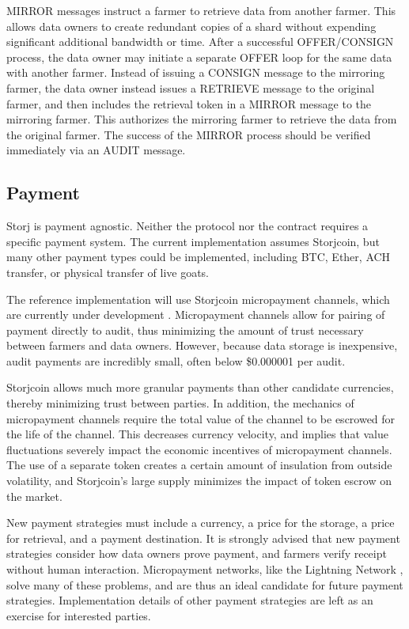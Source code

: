 \documentclass[a4paper,10pt]{article}
\begin{document}
MIRROR messages instruct a farmer to retrieve data from another farmer. This
allows data owners to create redundant copies of a shard without expending
significant additional bandwidth or time. After a successful OFFER/CONSIGN
process, the data owner may initiate a separate OFFER loop for the same data
with another farmer. Instead of issuing a CONSIGN message to the mirroring
farmer, the data owner instead issues a RETRIEVE message to the original farmer,
and then includes the retrieval token in a MIRROR message to the mirroring
farmer. This authorizes the mirroring farmer to retrieve the data from the
original farmer. The success of the MIRROR process should be verified
immediately via an AUDIT message.

\subsection{Payment}
Storj is payment agnostic. Neither the protocol nor the contract requires a
specific payment system. The current implementation assumes Storjcoin, but many
other payment types could be implemented, including BTC, Ether, ACH transfer, or
physical transfer of live goats.

The reference implementation will use Storjcoin micropayment channels, which are
currently under development \cite{26}. Micropayment channels allow for pairing
of payment directly to audit, thus minimizing the amount of trust necessary
between farmers and data owners. However, because data storage is inexpensive,
audit payments are incredibly small, often below \$0.000001 per audit.

Storjcoin allows much more granular payments than other candidate currencies,
thereby minimizing trust between parties. In addition, the mechanics of
micropayment channels require the total value of the channel to be escrowed for
the life of the channel. This decreases currency velocity, and implies that
value fluctuations severely impact the economic incentives of micropayment
channels. The use of a separate token creates a certain amount of insulation
from outside volatility, and Storjcoin's large supply minimizes the impact of
token escrow on the market.

New payment strategies must include a currency, a price for the storage, a price
for retrieval, and a payment destination. It is strongly advised that new
payment strategies consider how data owners prove payment, and farmers verify
receipt without human interaction. Micropayment networks, like the Lightning
Network \cite{25}, solve many of these problems, and are thus an ideal candidate
for future payment strategies. Implementation details of other payment
strategies are left as an exercise for interested parties.
\end{document}

